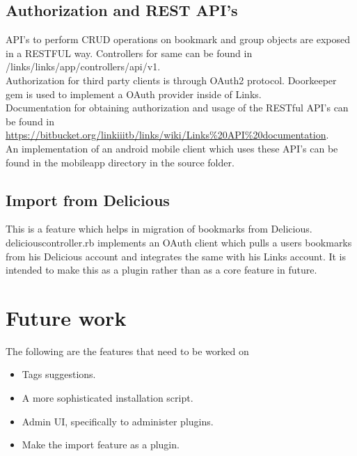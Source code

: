 \documentclass[11pt]{report} %
\begin{document}
\section{Authorization and REST API's}
API's to perform CRUD operations on bookmark and group objects are exposed in a RESTFUL way. Controllers for same can be found in /links/links/app/controllers/api/v1.
 \\
 
\noindent
Authorization for third party clients is through OAuth2 protocol. Doorkeeper gem is used to implement a OAuth provider inside of Links.
 \\
 
\noindent
Documentation for obtaining authorization and usage of the RESTful API's can be found in \href{https://bitbucket.org/linkiiitb/links/wiki/Links\%20API\%20documentation}{https://bitbucket.org/linkiiitb/links/wiki/Links\%20API\%20documentation}.
 \\
 
\noindent
An implementation of an android mobile client which uses these API's can be found in the mobile\textunderscore app directory in the source folder.
 \\
 
\section{Import from Delicious}
This is a feature which helps in migration of bookmarks from Delicious. delicious\textunderscore controller.rb implements an OAuth client which pulls a users bookmarks from his Delicious account and integrates the same with his Links account. It is intended to make this as a plugin rather than as a core feature in future.

\chapter{Future work}
The following are the features that need to be worked on
\begin{itemize}
\item
Tags suggestions.
\item
A more sophisticated installation script.
\item
Admin UI, specifically to administer plugins.
\item
Make the import feature as a plugin.
\end{itemize}
\end{document}
